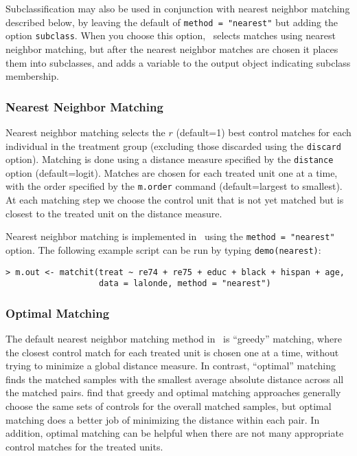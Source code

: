 Subclassification may also be used in conjunction with nearest
neighbor matching described below, by leaving the default of
\texttt{method = "nearest"} but adding the option \texttt{subclass}.
When you choose this option, \MatchIt\ selects matches using nearest neighbor
matching, but
after the nearest neighbor matches are chosen it places them into
subclasses, and adds a variable to the output object indicating subclass membership.


\subsubsection{Nearest Neighbor Matching}
\label{subsubsec:nearest}

Nearest neighbor matching selects the $r$ (default=1) best control
matches for each individual in the treatment group (excluding those
discarded using the \texttt{discard} option).  Matching is done
using a distance measure specified by the {\tt distance} option
(default=logit).  Matches are chosen for each treated unit one at a
time, with the order specified by the \texttt{m.order} command (default=largest to smallest).  
At each matching step we choose the control unit that is not
yet matched but is closest to the treated unit on the distance
measure.

Nearest neighbor matching is implemented in \MatchIt\ using the
\texttt{method = "nearest"} option.  The following example script can
be run by typing {\tt demo(nearest)}:
\begin{verbatim}
> m.out <- matchit(treat ~ re74 + re75 + educ + black + hispan + age, 
                   data = lalonde, method = "nearest")
\end{verbatim}

\subsubsection{Optimal Matching}
\label{subsubsec:optimal}

The default nearest neighbor matching method in \MatchIt\ is
``greedy'' matching, where the closest control match for each treated
unit is chosen one at a time, without trying to minimize a global
distance measure.  In contrast, ``optimal'' matching finds the matched
samples with the smallest average absolute distance across all the
matched pairs.  \citet{GuRos93} find that greedy and optimal matching
approaches generally choose the same sets of controls for the overall
matched samples, but optimal matching does a better job of minimizing
the distance within each pair.  In addition, optimal matching can be
helpful when there are not many appropriate control matches for the
treated units.

